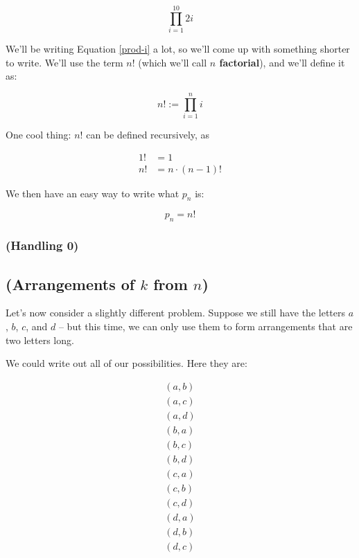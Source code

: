 \begin{equation*}
\prod_{i=1}^{10} 2i
\end{equation*}

We'll be writing Equation \ref{prod-i} a lot, so we'll come up with something shorter to write. We'll use the term $n!$ (which we'll call \textbf{$n$ factorial}), and we'll define it as:

\begin{equation}
\label{eq:factorial-def}
n! := \prod_{i=1}^n i
\end{equation}

One cool thing: $n!$ can be defined recursively, as

\begin{align}
1! &= 1 \\
n! &= n \cdot (n-1)!
\end{align}

We then have an easy way to write what $p_n$ is:

\begin{equation}
p_n = n!
\end{equation}



\subsubsection{(Handling 0)}



\subsection{(Arrangements of $k$ from $n$)}

Let's now consider a slightly different problem. Suppose we still have the letters $a$, $b$, $c$, and $d$ -- but this time, we can only use them to form arrangements that are two letters long.

We could write out all of our possibilities. Here they are:

\begin{gather*}
(a, b) \\
(a, c) \\
(a, d) \\
(b, a) \\
(b, c) \\
(b, d) \\
(c, a) \\
(c, b) \\
(c, d) \\
(d, a) \\
(d, b) \\
(d, c) \\
\end{gather*}

